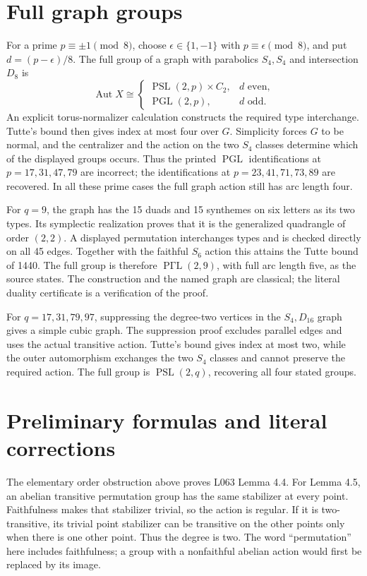 \documentclass[11pt]{article}
\newcommand{\PSL}{\operatorname{PSL}}\newcommand{\PGL}{\operatorname{PGL}}
\newcommand{\Aut}{\operatorname{Aut}}\newcommand{\F}{\mathbb F}
\begin{document}
\section{Full graph groups}
For a prime $p\equiv\pm1\pmod8$, choose $\epsilon\in\{1,-1\}$
with $p\equiv\epsilon\pmod8$, and put $d=(p-\epsilon)/8$.
The full group of a graph with parabolics $S_4,S_4$ and intersection
$D_8$ is
\[
 \Aut X\cong
 \begin{cases}
 \PSL(2,p)\times C_2,&d\text{ even},\\
 \PGL(2,p),&d\text{ odd}.
 \end{cases}
\]
An explicit torus-normalizer calculation constructs the required type
interchange. Tutte's bound then gives index at most four over $G$.
Simplicity forces $G$ to be normal, and the centralizer and the action
on the two $S_4$ classes determine which of the displayed groups occurs.
Thus the printed $\PGL$ identifications at $p=17,31,47,79$ are
incorrect; the identifications at $p=23,41,71,73,89$ are recovered.
In all these prime cases the full graph action still has arc length four.

For $q=9$, the graph has the 15 duads and 15 synthemes on six letters
as its two types. Its symplectic realization proves that it is the
generalized quadrangle of order $(2,2)$. A displayed permutation
interchanges types and is checked directly on all 45 edges. Together
with the faithful $S_6$ action this attains the Tutte bound of 1440.
The full group is therefore $\operatorname{P\Gamma L}(2,9)$, with full arc length
five, as the source states. The construction and the named graph are
classical; the literal duality certificate is a verification of the proof.

For $q=17,31,79,97$, suppressing the degree-two vertices in the
$S_4,D_{16}$ graph gives a simple cubic graph. The suppression proof
excludes parallel edges and uses the actual transitive action. Tutte's
bound gives index at most two, while the outer automorphism exchanges
the two $S_4$ classes and cannot preserve the required action.
The full group is $\PSL(2,q)$, recovering all four stated groups.

\section{Preliminary formulas and literal corrections}
The elementary order obstruction above proves L063 Lemma 4.4.
For Lemma 4.5, an abelian transitive permutation group has the same
stabilizer at every point. Faithfulness makes that stabilizer trivial,
so the action is regular. If it is two-transitive, its trivial point
stabilizer can be transitive on the other points only when there is
one other point. Thus the degree is two. The word ``permutation''
here includes faithfulness; a group with a nonfaithful abelian action
would first be replaced by its image.
\end{document}
